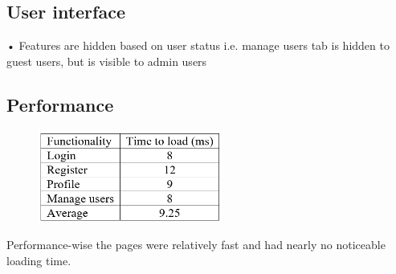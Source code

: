 \documentclass{article}
\begin{document}
\subsection{User interface}
•	Features are hidden based on user status i.e. manage users tab is hidden to guest users, but is visible to admin users\\

\subsection{Performance}
\begin{figure}[ht!]
\includegraphics[width=60mm]{15.png}
\end{figure}
Performance-wise the pages were relatively fast and had nearly no noticeable loading time.
\end{document}
